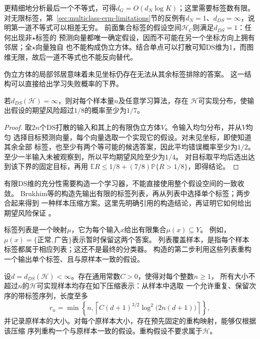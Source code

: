 更精细地分析最后一个不等式，可得$d_G=O(d_N\log K)$；这里需要标签数有限。
对无限标签，第~\ref{sec:multiclass-erm-limitations}节的反例有$d_N=1$、$d_{DS}=\infty$，说明第一道不等式可以相差无穷。
前面集合标签的假设空间$\mathcal H_C$则满足$d_{DS}=1$：任何出现非$\star$标签的
预测向量都唯一确定假设，因而不可能在另一个坐标方向上拥有邻居；全$\star$向量独自
也不能构成伪立方体。结合单点可以打散可知DS维为1，而图维无限，故后一道不等式也不能反向替代。

伪立方体的局部邻居意味着未见坐标仍存在无法从其余标签排除的答案。
这一结构可以直接给出学习失败概率的下界。

\begin{theorem}[无限DS维的不可学习性]
\label{thm:infinite-ds-lower-bound}
若$d_{DS}(\mathcal H)=\infty$，则对每个样本量$n$及任意学习算法，存在
$\mathcal H$可实现分布，使输出假设的期望风险超过$1/8$的概率至少为$1/7$。
\end{theorem}

\begin{proof}
取$2n$个DS打散的输入和其上的有限伪立方体$V$。令输入均匀分布，并从$V$均匀
选择目标预测向量，每个向量选取一个实现它的假设。对未见坐标，即使知道其余全部
标签，也至少有两个等可能的候选答案，因此平均错误概率至少为$1/2$。
至少一半输入未被观察到，所以平均期望风险至少为$1/4$。
对目标取平均后选出达到该下界的固定目标，再用
$\mathbb E R\leq1/8+(7/8)\mathbb P\{R>1/8\}$，即得结论。
\end{proof}

有限DS维的充分性需要构造一个学习器，不能直接使用整个假设空间的一致收敛。
Brukhim等的构造先输出有限的标签列表，再从列表中选择单个标签；两步合起来得到
一种样本压缩方案。这里先明确引用的构造结论，再证明它如何给出期望风险保证
。

标签列表是一个映射$\mu$，它为每个输入$x$给出有限集合$\mu(x)\subseteq Y$。
例如，$\mu(x)=\{\text{正常},\text{广告}\}$表示暂时保留这两个答案。
列表覆盖样本，是指每个样本标签都属于相应列表；这还不是最终的分类器。
构造的第二步利用这些列表重构一个输出单个标签、且与原样本一致的假设。

\begin{lemma}[有限DS维的压缩构造]
\label{lem:finite-ds-compression}
设$d=d_{DS}(\mathcal H)<\infty$。存在通用常数$C>0$，使得对每个整数$n\geq1$，
所有大小不超过$n$的$\mathcal H$可实现样本均存在如下压缩表示：从样本中选取
一个允许重复、保留次序的带标签序列，长度至多
\[
 r_n=\min\!\left\{n,\left\lceil
 C(d+1)^{3/2}\log^2\!\bigl(2n(d+1)\bigr)\right\rceil\right\},
\]
并记录原样本的大小。对每个原样本大小，存在预先固定的重构映射，能够仅根据该压缩
序列重构一个与原样本一致的假设。重构假设不要求属于$\mathcal H$。
\end{lemma}

